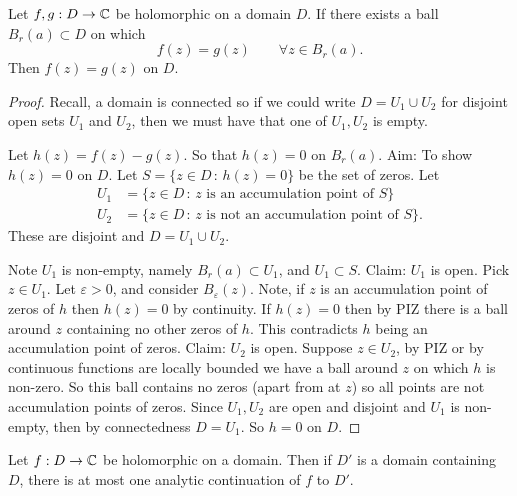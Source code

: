 \documentclass[10pt, a4paper]{article}
\begin{document}
\begin{lemma}
    Let $f, g : D \to \mathbb{C}$ be holomorphic on a domain $D$.
    If there exists a ball $B_r(a) \subset D$ on which
    \[
    f(z) = g(z)\qquad \forall z \in B_r(a).
    \]
    Then $f(z) = g(z)$ on $D$.

    \begin{proof}
        Recall,
        a domain is connected so if we could write $D = U_1 \cup U_2$ for disjoint open sets $U_1$ and $U_2$,
        then we must have that one of $U_1, U_2$ is empty.

        Let $h(z) = f(z) - g(z)$.
        So that $h(z) = 0$ on $B_r(a)$.
        Aim:
        To show $h(z) = 0$ on $D$.
        Let $S = \{z \in D\,:\,h(z) = 0\}$ be the set of zeros.
        Let
        \begin{align*}
            U_1 &= \{z \in D\,:\,z\text{ is an accumulation point of $S$}\} \\
            U_2 &= \{z \in D\,:\,z\text{ is not an accumulation point of $S$}\}.
        \end{align*}
        These are disjoint and $D = U_1 \cup U_2$.

        Note $U_1$ is non-empty,
        namely $B_r(a) \subset U_1$,
        and $U_1 \subset S$.
        Claim:
        $U_1$ is open.
        Pick $z \in U_1$.
        Let $\varepsilon > 0$,
        and consider $B_{\varepsilon}(z)$.
        Note,
        if $z$ is an accumulation point of zeros of $h$ then $h(z) = 0$ by continuity.
        If $h(z) = 0$ then by PIZ there is a ball around $z$ containing no other zeros of $h$.
        This contradicts $h$ being an accumulation point of zeros.
        Claim:
        $U_2$ is open.
        Suppose $z \in U_2$,
        by PIZ or by continuous functions are locally bounded we have a ball around $z$ on which $h$ is non-zero.
        So this ball contains no zeros
        (apart from at $z$)
        so all points are not accumulation points of zeros.
        Since $U_1, U_2$ are open and disjoint and $U_1$ is non-empty,
        then by connectedness $D = U_1$.
        So $h = 0$ on $D$.
    \end{proof}
\end{lemma}

\begin{theorem}
    Let $f : D \to \mathbb{C}$ be holomorphic on a domain.
    Then if $D'$ is a domain containing $D$,
    there is at most one analytic continuation of $f$ to $D'$.
\end{theorem}
\end{document}

